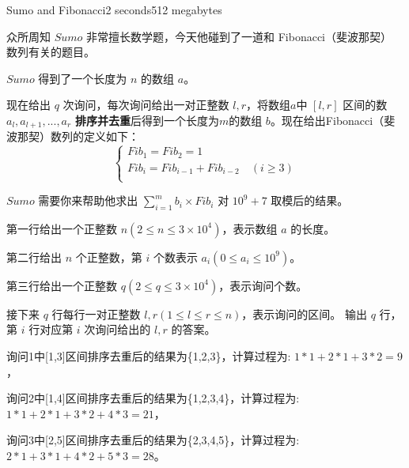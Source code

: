 \documentclass[11pt,a4paper,oneside]{article}
\begin{document}
\begin{problem}{Sumo and Fibonacci}{}{}{2 seconds}{512 megabytes}
	 
	 众所周知 $Sumo$ 非常擅长数学题，今天他碰到了一道和 Fibonacci（斐波那契） 数列有关的题目。
	 
	 $Sumo$ 得到了一个长度为 $n$ 的数组 $a$。
	 
	 现在给出 $q$ 次询问，每次询问给出一对正整数 $l,r$，将数组$a$中 $[l,r]$ 区间的数 $a_l,a_{l+1},...,a_{r}$ \textbf{排序并去重}后得到一个长度为$m$的数组 $b$。现在给出Fibonacci（斐波那契）数列的定义如下：
	 $$
	 	\begin{cases}
	 	Fib_1=Fib_2=1\\
	 	Fib_i=Fib_{i-1}+Fib_{i-2} \quad (i\geq 3)\\
	 	\end{cases}
	 $$
	 
	 $Sumo$ 需要你来帮助他求出 $\sum_{i=1}^{m} b_i\times Fib_i$ 对 $10^9+7$ 取模后的结果。
	 
	\InputFile
	第一行给出一个正整数 $n(2 \leq n \leq 3\times 10^4)$，表示数组 $a$ 的长度。
	
	第二行给出 $n$ 个正整数，第 $i$ 个数表示 $a_i(0\leq a_i\leq 10^9)$。
	
	第三行给出一个正整数 $q(2 \leq q \leq 3\times 10^4)$，表示询问个数。
	
	接下来 $q$ 行每行一对正整数 $l,r(1\leq l\leq r\leq n)$，表示询问的区间。
	\OutputFile
	输出 $q$ 行，第 $i$ 行对应第 $i$ 次询问给出的 $l,r$ 的答案。
	\Examples
	\begin{example}
	\end{example}
	\Explanation
	询问1中[1,3]区间排序去重后的结果为\{1,2,3\}，计算过程为:
	$
	1 * 1 + 2 * 1 + 3 * 2 = 9
	$，
	
	询问2中[1,4]区间排序去重后的结果为\{1,2,3,4\}，计算过程为:
	$
	1 * 1 + 2 * 1 + 3 * 2 + 4 * 3 = 21
	$，
	
	询问3中[2,5]区间排序去重后的结果为\{2,3,4,5\}，计算过程为:
	$
	2 * 1 + 3 * 1 + 4 * 2 + 5 * 3 = 28
	$。
\end{problem}
\end{document}
